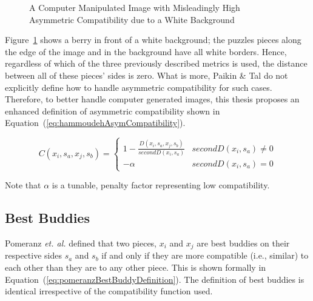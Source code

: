 \documentclass{report}
\def\eref#1{(\ref{#1})}
\begin{document}
\begin{figure}
\centering
{}
\caption{A Computer Manipulated Image with Misleadingly High Asymmetric Compatibility due to a White Background}
\label{fig:objectWhiteBackground}
\end{figure}

Figure~\ref{fig:objectWhiteBackground} shows a berry in front of a white background; the puzzles pieces along the edge of the image and in the background have all white borders.  Hence, regardless of which of the three previously described metrics is used, the distance between all of these pieces' sides is zero.  What is more, Paikin \& Tal do not explicitly define how to handle asymmetric compatibility for such cases.  Therefore, to better handle computer generated images, this thesis proposes an enhanced definition of asymmetric compatibility shown in Equation~\eref{eq:hammoudehAsymCompatibility}.  

\begin{equation} \label{eq:hammoudehAsymCompatibility}
C(x_i,s_a,x_j,s_b)= \begin{cases} 
	1 - \frac{D(x_i,s_a,x_j,s_b)}{secondD(x_i,s_a)} & secondD(x_i,s_a) \ne 0
\\
	-\alpha & secondD(x_i,s_a) = 0
\end{cases} 
\end{equation}

\noindent
Note that $\alpha$ is a tunable, penalty factor representing low compatibility.


\subsection{Best Buddies}\label{sec:bestBuddies}

Pomeranz \textit{et. al.} defined that two pieces, $x_i$ and $x_j$ are best buddies on their respective sides $s_a$ and $s_b$ if and only if they are more compatible (i.e., similar) to each other than they are to any other piece.  This is shown formally in Equation~\eref{eq:pomeranzBestBuddyDefinition}.  The definition of best buddies is identical irrespective of the compatibility function used.
\end{document}
